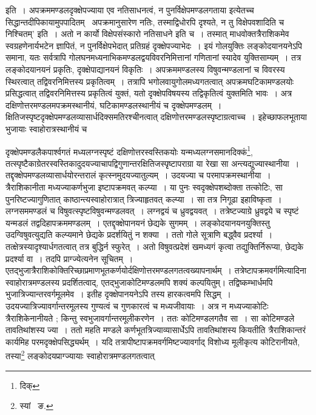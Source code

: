 \documentclass[11pt, openany]{book}
\begin{document}
\noindent इति~। अपक्रममण्डलदृक्क्षेपज्याया एव नतिसाधनत्वं, न पुनर्विक्षेपमण्डलगताया इत्येतच्च सिद्धान्तदीपिकायामुपपादितम् \textendash\ {\qt अपक्रमानुसारेण नतिः, तस्माद्विधोरपि दृश्यते, न तु विक्षेपवशादिति च निश्चितम्'} इति~। {\qt अतो न कार्यो विक्षेपसंस्कारो नतिसाधने} इति च~। तस्मात् माधवोक्तत्रैराशिकमेव स्वग्रहणेनार्यभटेन ज्ञापितं, न पुनर्विक्षेपभेदात् प्रतिग्रहं दृक्क्षेपज्याभेदः~। इयं गोलयुक्तिः लङ्कोदयानयनेऽपि समाना, यतः सर्वत्रापि गोलघनमध्यनाभिकमण्डलद्वयविवरनिमित्तानां गणितानां स्यादेव युक्तिसाम्यम्~। तत्र लङ्कोदयानयनं प्रकृतिः, दृक्क्षेपाद्यानयनं विकृतिः~। अपक्रममण्डलस्य विषुवन्मण्डलानां च विवरस्य स्थिरत्वात् तद्विवरनिमित्तस्य प्रकृतित्वम्~। तत्रापि भगोलवायुगोलमध्यगतत्वात् अपक्रमघटिकामण्डलयोः प्रसिद्धत्वात् तद्विवरनिमित्तस्य प्रकृतित्वं युक्तं, 
यतो दृक्क्षेपविषयस्य तद्विकृतित्वं युक्तमिति भावः~। अत्र दक्षिणोत्तरमण्डलमपक्रमस्थानीयं, घटिकामण्डलस्थानीयं च दृक्क्षेपमण्डलम्~। 
क्षितिजस्पृष्टदृक्क्षेपमण्डलव्यासार्धदिक्समतिरश्चीनत्वात् दक्षिणोत्तरमण्डलस्पृष्टाग्रत्वाच्च~। इहेच्छाफलभूताया भुजायाः स्वाहोरात्रस्थानीयं च

\newpage

\noindent दृक्क्षेपमण्डलैकपार्श्वगतं मध्यलग्नस्पृष्टं दक्षिणोत्तरस्वस्तिकयोः यन्मध्यलग्नसमानदिक्कं\renewcommand{\thefootnote}{१}\footnote{दिक्},
तत्स्पृष्टैकाग्रेतरस्वस्तिकादुदयज्याचापद्विगुणान्तरक्षितिजस्पृृष्टापराग्रा या रेखा सा अन्त्यद्युज्यास्थानीया~। तद्दृक्क्षेपमण्डलव्यासार्धयोरन्तरालं कृत्स्नमुदयज्यातुल्यम्~। उदयज्या च परमापक्रमस्थानीया~। त्रैराशिकानीता मध्यज्याकर्णभुजा इष्टापक्रमवत् कल्प्या~। या पुनः स्वदृक्क्षेपशब्दोक्ता तत्कोटिः, सा पुनरिष्टज्यागुणितात् काष्ठान्त्यस्वाहोरात्रात् त्रिज्याहृतवत् कल्प्या~। सा तत्र निगूढा इहाविष्कृता~।
लग्नसममण्डलं च विषुवत्स्पृष्टविषुवन्मण्डलवत्~। लग्नद्वयं च ध्रुवद्वयवत्~। तत्रेष्टज्याग्रे ध्रुवद्वये च स्पृष्टं यन्मडलं तद्वदिहापक्रममण्डलम्~।
एतद्दृक्क्षेपानयनं छेद्यके सुगमम्~। लङ्कोदयानयनयुक्तिस्तु उदग्विषुवत्युद्यति कल्प्यमाने छेद्यके प्रदर्शयितुं न शक्या~। ततो गोले सूत्राणि बद्ध्वैव प्रदर्श्या~। तत्क्षेत्रस्यादृश्यार्धगतत्वात् तत्र बुद्धिर्न स्फुरेत्~। अतो विषुवत्प्रदेशं खमध्यगं कृत्वा तद्युक्तिर्निरूप्या, छेद्यके प्रदर्श्या वा~।
तदपि प्राग्ज्येत्यनेन सूचितम्~। एतद्भुजात्रैराशिकोक्तिरिच्छाप्रमाणभूतकर्णयोर्दक्षिणोत्तरमण्डलगतत्वख्यापनार्थम्~। तत्रेष्टापक्रमवर्गमित्यादिना
स्वाहोरात्रमण्डलस्य प्रदर्शितत्वाद्, एतद्भुजाकोटिमण्डलमपि शक्यं कल्पयितुम्। तद्विष्कम्भार्धमपि भुजात्रिज्यान्तरवर्गमूलमेव~। इतीह दृक्क्षेपानयनेऽपि
तस्य हारकत्वमपि सिद्धम्~। उदयज्यात्रिज्यावर्गान्तरमूलस्य गुण्यत्वं च गुणकारत्वं च मध्यजीवायाः~। अत्र न मध्यज्याकोटिः त्रैराशिकेनानीयते ; किन्तु स्वभुजावर्गान्तरमूलीकरणेन~। ततः कोटिमण्डलगतैव सा~। सा कोटिमण्डले तावतिथांशस्य ज्या~। ततो महति मण्डले कर्णभूतत्रिज्याव्यासार्धेऽपि तावतिथांशस्य कियतीति त्रैराशिकान्तरं कार्यमिह परमदृक्क्षेपसिद्ध्यर्थम्~। यदि तत्रापीष्टापक्रमवर्गमिष्टज्यावर्गाद्
विशोध्य मूलीकृत्य कोटिरानीयते, तस्या\renewcommand{\thefootnote}{२}\footnote{स्यां \textendash\ ङ.} लङ्कोदयप्राग्ज्यायाः स्वाहोरात्रमण्डलगतत्वात् 
\end{document}
